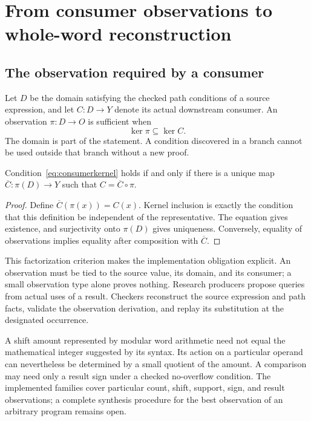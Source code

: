 \section{From consumer observations to whole-word reconstruction}\label{sec:observations}

\subsection{The observation required by a consumer}
Let $D$ be the domain satisfying the checked path conditions of a source expression, and let $C:D\to Y$ denote its actual downstream consumer. An observation $\pi:D\to O$ is sufficient when
\begin{equation}\label{eq:consumerkernel}
 \ker\pi\subseteq\ker C.
\end{equation}
The domain is part of the statement. A condition discovered in a branch cannot be used outside that branch without a new proof.

\begin{proposition}\label{prop:consumerfactor}
Condition~\eqref{eq:consumerkernel} holds if and only if there is a unique map
$\overline C:\pi(D)\to Y$ such that $C=\overline C\circ\pi$.
\end{proposition}
\begin{proof}
Define $\overline C(\pi(x))=C(x)$. Kernel inclusion is exactly the condition that this definition be independent of the representative. The equation gives existence, and surjectivity onto $\pi(D)$ gives uniqueness. Conversely, equality of observations implies equality after composition with $\overline C$.
\end{proof}

This factorization criterion makes the implementation obligation explicit. An observation must be tied to the source value, its domain, and its consumer; a small observation type alone proves nothing. Research producers propose queries from actual uses of a result. Checkers reconstruct the source expression and path facts, validate the observation derivation, and replay its substitution at the designated occurrence.

A shift amount represented by modular word arithmetic need not equal the mathematical integer suggested by its syntax. Its action on a particular operand can nevertheless be determined by a small quotient of the amount. A comparison may need only a result sign under a checked no-overflow condition. The implemented families cover particular count, shift, support, sign, and result observations; a complete synthesis procedure for the best observation of an arbitrary program remains open.

